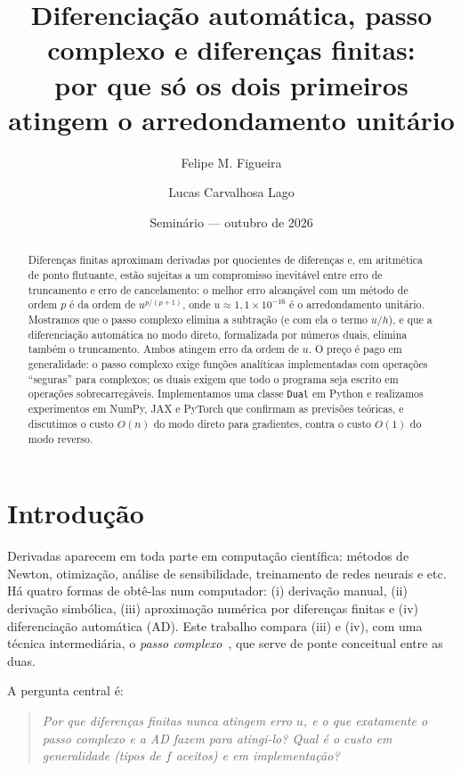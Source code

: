 \documentclass[11pt,a4paper]{article}
\title{Diferenciação automática, passo complexo e diferenças finitas:\\
\large por que só os dois primeiros atingem o arredondamento unitário}
\author{Felipe M. Figueira \and Lucas Carvalhosa Lago}
\date{\small Seminário --- outubro de 2026}
\begin{document}
\maketitle

\begin{abstract}
Diferenças finitas aproximam derivadas por quocientes de diferenças e, em aritmética de ponto flutuante, estão sujeitas a um compromisso inevitável entre erro de truncamento e erro de cancelamento: o melhor erro alcançável com um método de ordem $p$ é da ordem de $u^{p/(p+1)}$, onde $u\approx1{,}1\times10^{-16}$ é o arredondamento unitário. Mostramos que o passo complexo elimina a subtração (e com ela o termo $u/h$), e que a diferenciação automática no modo direto, formalizada por números duais, elimina também o truncamento. Ambos atingem erro da ordem de $u$. O preço é pago em generalidade: o passo complexo exige funções analíticas implementadas com operações ``seguras'' para complexos; os duais exigem que todo o programa seja escrito em operações sobrecarregáveis. Implementamos uma classe \texttt{Dual} em Python e realizamos experimentos em NumPy, JAX e PyTorch que confirmam as previsões teóricas, e discutimos o custo $O(n)$ do modo direto para gradientes, contra o custo $O(1)$ do modo reverso.
\end{abstract}

\tableofcontents

\section{Introdução}

Derivadas aparecem em toda parte em computação científica: métodos de Newton, otimização, análise de sensibilidade, treinamento de redes neurais e etc. Há quatro formas de obtê-las num computador: (i) derivação manual, (ii) derivação simbólica, (iii) aproximação numérica por diferenças finitas e (iv) diferenciação automática (AD). Este trabalho compara (iii) e (iv), com uma técnica intermediária, o \emph{passo complexo}~\cite{squire1998,martins2003}, que serve de ponte conceitual entre as duas.

A pergunta central é:

\begin{quote}
\emph{Por que diferenças finitas nunca atingem erro $u$, e o que exatamente o passo complexo e a AD fazem para atingi-lo? Qual é o custo em generalidade (tipos de $f$ aceitos) e em implementação?}
\end{quote}
\end{document}
